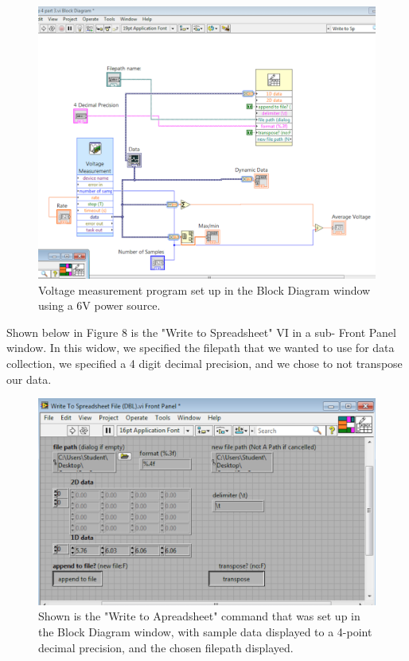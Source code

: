 \documentclass[twoside,10pt]{article}
\begin{document}
\begin{multicols}{2}
			\begin{figure}[H]
			\centering
			\includegraphics[width=\linewidth]{2.png}
			\caption{Voltage measurement program set up in the Block Diagram window using a 6V power source.}
		\end{figure}
	
		Shown below in Figure 8 is the "Write to Spreadsheet" VI in a sub- Front Panel window. In this widow, we specified the filepath that we wanted to use for data collection, we specified a 4 digit decimal precision, and we chose to not transpose our data.
	
		\begin{figure}[H]
		\centering
		\includegraphics[width=\linewidth]{3.png}
		\caption{Shown is the "Write to Apreadsheet" command that was set up in the Block Diagram window, with sample data displayed to a 4-point decimal precision, and the chosen filepath displayed.}
	\end{figure}
		

\end{multicols}
\end{document}
